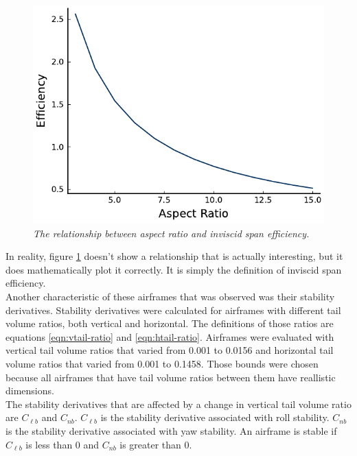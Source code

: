\documentclass{journal}
\begin{document}
	\begin{figure}[H]
		\centering
		\includegraphics{../graphics/efficiency.pdf}
		\caption{\emph{The relationship between aspect ratio and inviscid span efficiency.}}
		\label{fig:efficiency}
	\end{figure}
	
	In reality, figure \ref{fig:efficiency} doesn't show a relationship that is actually interesting, but it does mathematically plot it correctly. It is simply the definition of inviscid span efficiency.\\
	
	Another characteristic of these airframes that was observed was their stability derivatives. Stability derivatives were calculated for airframes with different tail volume ratios, both vertical and horizontal. The definitions of those ratios are equations \ref{eqn:vtail-ratio} and \ref{eqn:htail-ratio}. Airframes were evaluated with vertical tail volume ratios that varied from 0.001 to 0.0156 and horizontal tail volume ratios that varied from 0.001 to 0.1458. Those bounds were chosen because all airframes that have tail volume ratios between them have reallistic dimensions.\\ 
	
	The stability derivatives that are affected by a change in vertical tail volume ratio are \(C_{\ell{b}}\) and \(C_{nb}\). \(C_{\ell{b}}\) is the stability derivative associated with roll stability. \(C_{nb}\) is the stability derivative associated with yaw stability. An airframe is stable if \(C_{\ell{b}}\) is less than 0 and \(C_{nb}\) is greater than 0.\\
	
\end{document}

